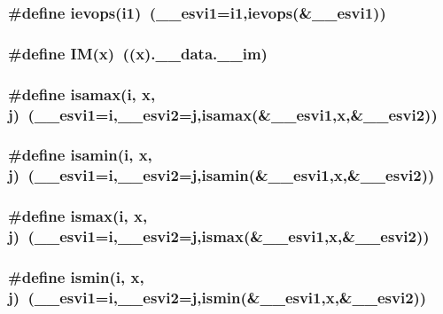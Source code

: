 \subsubsection{\setlength{\rightskip}{0pt plus 5cm}\#define ievops(i1)~({\bf \_\-\_\-esvi1}=i1,ievops(\&{\bf \_\-\_\-esvi1}))}\label{essl_8h_7f41a5c2cf2c6ce2fa9228eda433cad7}


\subsubsection{\setlength{\rightskip}{0pt plus 5cm}\#define IM(x)~((x).\_\-\_\-data.\_\-\_\-im)}\label{essl_8h_b52656a2ffb9da83eb2b959b3c955235}


\subsubsection{\setlength{\rightskip}{0pt plus 5cm}\#define isamax(i, x, j)~({\bf \_\-\_\-esvi1}=i,{\bf \_\-\_\-esvi2}=j,isamax(\&{\bf \_\-\_\-esvi1},x,\&{\bf \_\-\_\-esvi2}))}\label{essl_8h_bd80a73ff9d8ed7105af071286adfa14}


\subsubsection{\setlength{\rightskip}{0pt plus 5cm}\#define isamin(i, x, j)~({\bf \_\-\_\-esvi1}=i,{\bf \_\-\_\-esvi2}=j,isamin(\&{\bf \_\-\_\-esvi1},x,\&{\bf \_\-\_\-esvi2}))}\label{essl_8h_579660a57ce98dbe42c8db6f07c271a0}


\subsubsection{\setlength{\rightskip}{0pt plus 5cm}\#define ismax(i, x, j)~({\bf \_\-\_\-esvi1}=i,{\bf \_\-\_\-esvi2}=j,ismax(\&{\bf \_\-\_\-esvi1},x,\&{\bf \_\-\_\-esvi2}))}\label{essl_8h_a0b9344d89136e1c740f22c647836481}


\subsubsection{\setlength{\rightskip}{0pt plus 5cm}\#define ismin(i, x, j)~({\bf \_\-\_\-esvi1}=i,{\bf \_\-\_\-esvi2}=j,ismin(\&{\bf \_\-\_\-esvi1},x,\&{\bf \_\-\_\-esvi2}))}\label{essl_8h_07ec4602ac975244424be1e22c848675}


